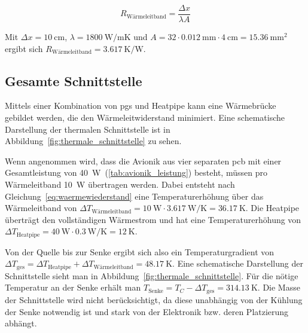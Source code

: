\begin{equation*}
  R_\mathrm{Wärmeleitband} = \frac{\Delta x}{\lambda A}
\end{equation*}

Mit $\Delta x = \SI{10}{\centi\meter}$, $\lambda = \SI{1800}{\watt\per\meter\kelvin}$ und $A = 32 \cdot \SI{0,012}{\milli\meter} \cdot \SI{4}{\centi\meter} = \SI{15,36}{\milli\meter\squared}$
ergibt sich $R_\mathrm{Wärmeleitband} = \SI{3,617}{\kelvin\per\watt}$.

\subsection{Gesamte Schnittstelle}\label{sec:gesamte_schnittstelle}

Mittels einer Kombination von \ac{pgs} und Heatpipe kann eine Wärmebrücke gebildet werden, die den Wärmeleitwiderstand
minimiert. Eine schematische Darstellung der thermalen Schnittstelle ist in Abbildung~\ref{fig:thermale_schnittstelle} zu sehen.

Wenn angenommen wird, dass die Avionik aus vier separaten \ac{pcb} mit einer Gesamtleistung von \SI{40}{\watt}~(\ref{tab:avionik_leistung}) besteht, müssen pro Wärmeleitband \SI{10}{\watt} übertragen werden.
Dabei entsteht nach Gleichung~\ref{eq:waermewiederstand} eine Temperaturerhöhung über das Wärmeleitband von $\Delta T_\mathrm{Wärmeleitband} = \SI{10}{\watt} \cdot \SI{3,617}{\watt\per\kelvin} = \SI{36,17}{\kelvin}$.
Die Heatpipe überträgt den vollständigen Wärmestrom und hat eine Temperaturerhöhung von $\Delta T_\mathrm{Heatpipe} = \SI{40}{\watt} \cdot \SI{0,3}{\watt\per\kelvin} = \SI{12}{\kelvin}$.

Von der Quelle bis zur Senke ergibt sich also ein Temperaturgradient von $\Delta T_\mathrm{ges} = \Delta T_\mathrm{Heatpipe} + \Delta T_\mathrm{Wärmeleitband} = \SI{48,17}{\kelvin}$.
Eine schematische Darstellung der Schnittstelle sieht man in Abbildung~\ref{fig:thermale_schnittstelle}. Für die nötige Temperatur an der Senke
erhält man $T_\mathrm{Senke} = T_C - \Delta T_\mathrm{ges} = \SI{314,13}{\kelvin}$. Die Masse der Schnittstelle wird nicht berücksichtigt, da diese
unabhängig von der Kühlung der Senke notwendig ist und stark von der Elektronik bzw. deren Platzierung abhängt.

